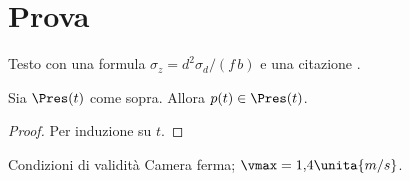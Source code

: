 

\section{Prova}
Testo con una formula $\sigma_z = d^2\sigma_d/(f\,b)$ e una citazione \cite{chiaveprova}.
\begin{proposizione}[Contenimento]\label{prop:prova} Sia $\Pres(t)$ come sopra. Allora $p(t)\in\Pres(t)$. \end{proposizione}
\begin{proof} Per induzione su $t$. \end{proof}
\begin{riquadro}{Condizioni di validità} Camera ferma; $\vmax = 1{,}4\unita{m/s}$.\end{riquadro}



